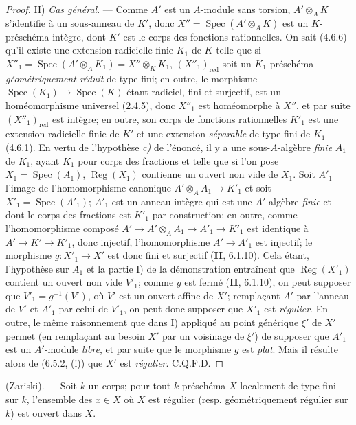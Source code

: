 \begin{proof}
II) \emph{Cas général}. --- Comme $A'$ est un $A$-module sans torsion,
$A'\otimes_AK$ s'identifie à un sous-anneau de $K'$, donc
$X''=\operatorname{Spec}(A'\otimes_AK)$ est un $K$-préschéma intègre, dont
$K'$ est le corps des fonctions rationnelles. On sait (4.6.6) qu'il existe
une extension radicielle finie $K_1$ de $K$ telle que si
$X''_1=\operatorname{Spec}(A'\otimes_AK_1)=X''\otimes_KK_1$,
$(X''_1)_{\mathrm{red}}$ soit un $K_1$-préschéma \emph{géométriquement réduit} de
type fini; en outre, le morphisme $\operatorname{Spec}(K_1)\to
\operatorname{Spec}(K)$ étant radiciel, fini et surjectif, est un
homéomorphisme universel (2.4.5), donc $X''_1$ est homéomorphe à $X''$, et
par suite $(X''_1)_{\mathrm{red}}$ est intègre; en outre, son corps de
fonctions rationnelles $K'_1$ est une extension radicielle finie de $K'$ et
une extension \emph{séparable} de type fini de $K_1$ (4.6.1). En vertu de
l'hypothèse \emph{c)} de l'énoncé, il y a une sous-$A$-algèbre \emph{finie} $A_1$ de
$K_1$, ayant $K_1$ pour corps des fractions et telle que si l'on pose
$X_1=\operatorname{Spec}(A_1)$, $\operatorname{Reg}(X_1)$ contienne un
ouvert non vide de $X_1$. Soit $A'_1$ l'image de l'homomorphisme canonique
$A'\otimes_AA_1\to K'_1$ et soit $X'_1=\operatorname{Spec}(A'_1)$; $A'_1$
est un anneau intègre qui est une $A'$-algèbre \emph{finie} et dont le corps des
fractions est $K'_1$ par construction; en outre, comme l'homomorphisme
composé $A'\to A'\otimes_AA_1\to A'_1\to K'_1$ est identique à
$A'\to K'\to K'_1$, donc injectif, l'homomorphisme $A'\to A'_1$ est
injectif; le morphisme $g:X'_1\to X'$ est donc fini et surjectif
(\textbf{II}, 6.1.10). Cela étant, l'hypothèse sur $A_1$ et la partie I) de la
démonstration entraînent que $\operatorname{Reg}(X'_1)$
contient un ouvert non vide $V'_1$; comme $g$ est fermé (\textbf{II}, 6.1.10), on
peut supposer que $V'_1=g^{-1}(V')$, où $V'$ est un ouvert affine de $X'$;
remplaçant $A'$ par l'anneau de $V'$ et $A'_1$ par celui de $V'_1$, on peut
donc supposer que $X'_1$ est \emph{régulier}. En outre, le même raisonnement que
dans I) appliqué au point générique $\xi'$ de $X'$ permet (en remplaçant au
besoin $X'$ par un voisinage de $\xi'$) de supposer que $A'_1$ est un
$A'$-module \emph{libre}, et par suite que le morphisme $g$ est \emph{plat}. Mais il
résulte alors de (6.5.2, (i)) que $X'$ est \emph{régulier}. C.Q.F.D.
\end{proof}

\begin{corollary}[6.12.5]
\label{IV.2.s6.12.5-fr}
\textnormal{(Zariski).} --- Soit $k$ un corps; pour tout $k$-préschéma $X$
localement de type fini sur $k$, l'ensemble des $x\in X$ où $X$ est
régulier \textup{(resp.} géométriquement régulier sur $k$\textup{)} est ouvert dans $X$.
\end{corollary}

